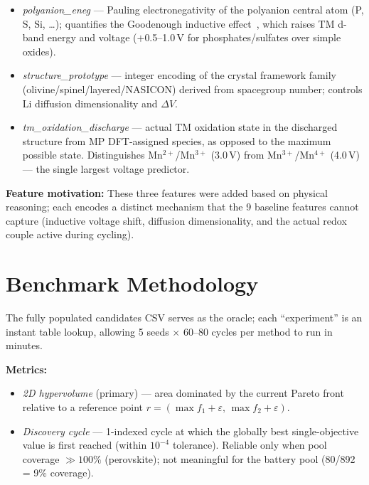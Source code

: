 \documentclass[10pt,twocolumn]{article}
\begin{document}
\begin{itemize}
  \item \emph{polyanion\_eneg} --- Pauling electronegativity of the polyanion
    central atom (P, S, Si, \ldots); quantifies the Goodenough inductive
    effect~\cite{goodenough}, which raises TM d-band energy and voltage
    ($+$0.5--1.0\,V for phosphates/sulfates over simple oxides).
  \item \emph{structure\_prototype} --- integer encoding of the crystal
    framework family (olivine/spinel/layered/NASICON) derived from
    spacegroup number; controls Li diffusion dimensionality and $\Delta V$.
  \item \emph{tm\_oxidation\_discharge} --- actual TM oxidation state in the
    discharged structure from MP DFT-assigned species, as opposed to the
    maximum possible state.  Distinguishes Mn$^{2+}$/Mn$^{3+}$ (3.0\,V) from
    Mn$^{3+}$/Mn$^{4+}$ (4.0\,V) --- the single largest voltage predictor.
\end{itemize}

\textbf{Feature motivation:} These three features were added based on physical
reasoning; each encodes a distinct mechanism that the 9 baseline features
cannot capture (inductive voltage shift, diffusion dimensionality, and the
actual redox couple active during cycling).

\section{Benchmark Methodology}

The fully populated candidates CSV serves as the oracle; each ``experiment''
is an instant table lookup, allowing 5 seeds $\times$ 60--80 cycles per method
to run in minutes.

\textbf{Metrics:}
\begin{itemize}
  \item \emph{2D hypervolume} (primary) --- area dominated by the current
    Pareto front relative to a reference point
    $r = (\max f_1 + \varepsilon,\, \max f_2 + \varepsilon)$.
  \item \emph{Discovery cycle} --- 1-indexed cycle at which the globally best
    single-objective value is first reached (within $10^{-4}$ tolerance).
    Reliable only when pool coverage $\gg 100\%$ (perovskite); not meaningful
    for the battery pool (80/892 = 9\% coverage).
\end{itemize}
\end{document}

